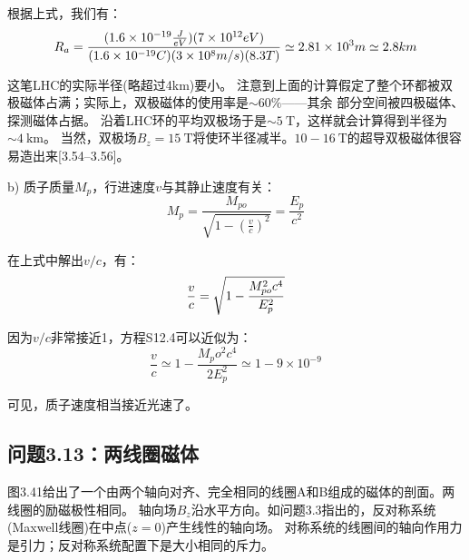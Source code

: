 根据上式，我们有：
\begin{equation*}
R_{a}=\frac{(1.6\times 10^{-19}\frac{J}{eV})(7\times 10^{12}eV)}{(1.6\times 10^{-19}C)(3\times 10^{8}m/s)(8.3T)}\\
\simeq 2.81\times 10^{3}m\simeq 2.8 km
\end{equation*}

这笔LHC的实际半径(略超过4km)要小。
注意到上面的计算假定了整个环都被双极磁体占满；实际上，双极磁体的使用率是$\sim 60\%$——其余
部分空间被四极磁体、探测磁体占据。
沿着LHC环的平均双极场于是$\sim 5\ \mathrm{T}$，这样就会计算得到半径为$\sim 4\ \mathrm{km}$。
当然，双极场$B_z=15\ \mathrm{T}$将使环半径减半。$10-16\ \mathrm{T}$的超导双极磁体很容易造出来[3.54–3.56]。

b) 质子质量$M_p$，行进速度$v$与其静止速度有关：
\begin{equation}
M_{p}=\frac{M_{po}}{\sqrt{1-(\frac{v}{c})^{2}}}=\frac{E_{p}}{c^{2}}%
\end{equation}

在上式中解出$v/c$，有：
\begin{equation}
\frac{v}{c}=\sqrt{1-\frac{M_{po}^{2}c^{4}}{E_{p}^{2}}}\\%
\end{equation}

因为$v/c$非常接近1，方程S12.4可以近似为：
\begin{equation*}
\frac{v}{c}\simeq 1-\frac{M_po^2 c^4}{2E_p^2}\simeq 1-9\times 10^{-9}
\end{equation*}

可见，质子速度相当接近光速了。
\newpage



\subsection{问题3.13：两线圈磁体}
图3.41给出了一个由两个轴向对齐、完全相同的线圈A和B组成的磁体的剖面。两线圈的励磁极性相同。
轴向场$B_z$沿水平方向。如问题3.3指出的，反对称系统(Maxwell线圈)在中点($z=0$)产生线性的轴向场。
对称系统的线圈间的轴向作用力是引力；反对称系统配置下是大小相同的斥力。

